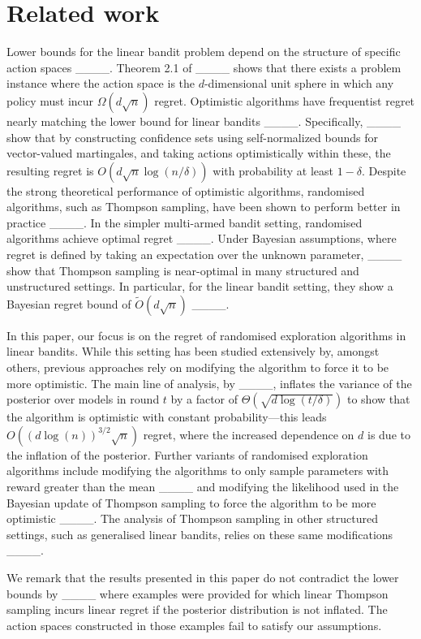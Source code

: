 \section{Related work}
Lower bounds for the linear bandit problem depend on the structure of specific action spaces ____. 
Theorem 2.1 of ____ shows that there exists a problem instance where the action space is the $d$-dimensional unit sphere in which any policy must incur $\Omega(d\sqrt{n})$ regret. Optimistic algorithms have frequentist regret nearly matching the lower bound for linear bandits ____.
Specifically, ____ show that by constructing confidence sets using self-normalized bounds for vector-valued martingales, and taking actions optimistically within these, the resulting regret is $O(d \sqrt{n} \log(n/\delta))$ with probability at least $1-\delta$. Despite the strong theoretical performance of optimistic algorithms, randomised algorithms, such as Thompson sampling, have been shown to perform better in practice ____. In the simpler multi-armed bandit setting, randomised algorithms achieve optimal regret 
____. 
Under Bayesian assumptions, where regret is defined by taking an expectation over the unknown parameter, ____ show that Thompson sampling is near-optimal in many structured and unstructured settings. In particular, for the linear bandit setting, they show a Bayesian regret bound of $\widetilde O(d\sqrt{n})$ ____.

In this paper, our focus is on the regret of randomised exploration algorithms in linear bandits. While this setting has been studied extensively by, amongst others, previous approaches rely on modifying the algorithm to force it to be more optimistic. The main line of analysis, by ____, inflates the variance of the posterior over models in round $t$ by a factor of $\Theta(\sqrt{d \log(t/\delta)})$ to show that the algorithm is optimistic with constant probability---this leads $O((d\log(n))^{3/2}\sqrt{n})$ regret, where the increased dependence on $d$ is due to the inflation of the posterior. Further variants of randomised exploration algorithms include modifying the algorithms to only sample parameters with reward greater than the mean ____ and modifying the likelihood used in the Bayesian update of Thompson sampling to force the algorithm to be more optimistic ____. The analysis of Thompson sampling in other structured settings, such as generalised linear bandits, relies on these same modifications ____.

We remark that the results presented in this paper do not contradict the lower bounds by ____ where examples were provided for which linear Thompson sampling incurs linear regret if the posterior distribution is not inflated. The action spaces constructed in those examples fail to satisfy our assumptions.







